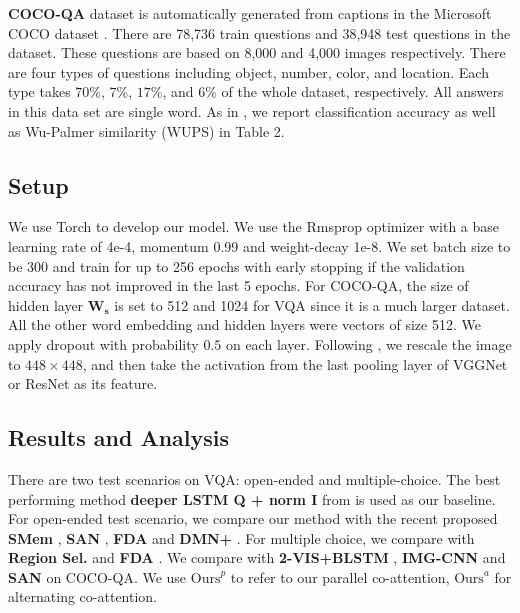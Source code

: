 \documentclass{article}
\begin{document}
\textbf{COCO-QA} dataset \cite{ren2015exploring} is automatically generated from captions in the Microsoft COCO dataset \cite{lin2014microsoft}. There are 78,736 train questions and 38,948 test questions in the dataset. These questions are based on 8,000 and 4,000 images respectively.  There are four types of questions including object, number, color, and location. Each type takes $70\%$, $7\%$, $17\%$, and $6\%$ of the whole dataset, respectively. All answers in this data set are single word. As in \cite{ren2015exploring}, we report classification accuracy as well as Wu-Palmer similarity (WUPS) in Table 2.
\subsection{Setup}
We use Torch \cite{torch} to develop our model. We use the Rmsprop optimizer with a base learning rate of 4e-4, momentum 0.99 and weight-decay 1e-8. We set batch size to be 300 and train for up to 256 epochs with early stopping if the validation accuracy has not improved in the last 5 epochs. For COCO-QA, the size of hidden layer $\bm{W_s}$ is set to 512 and 1024 for VQA since it is a much larger dataset. All the other word embedding and hidden layers were vectors of size 512. We apply dropout with probability $0.5$ on each layer. Following \cite{yang2015stacked}, we rescale the image to $448 \times 448$, and then take the activation from the last pooling layer of VGGNet \cite{Simonyan14c} or ResNet \cite{he2015deep} as its feature.
\subsection{Results and Analysis}
There are two test scenarios on VQA: open-ended and multiple-choice. The best performing method \textbf{deeper LSTM Q + norm I} from \cite{antol2015vqa} is used as our baseline. For open-ended test scenario, we compare our method with the recent proposed \textbf{SMem} \cite{xu2015ask}, \textbf{SAN} \cite{yang2015stacked}, \textbf{FDA} \cite{Ilievski2016} and \textbf{DMN+} \cite{xiong2016dynamic}. For multiple choice, we compare with \textbf{Region Sel.} \cite{shih2015look} and \textbf{FDA} \cite{Ilievski2016}. We compare with \textbf{2-VIS+BLSTM} \cite{ren2015exploring}, \textbf{IMG-CNN} \cite{ma2015learning} and \textbf{SAN} \cite{yang2015stacked} on COCO-QA. We use $\textrm{Ours}^p$ to refer to our parallel co-attention, $\textrm{Ours}^a$ for alternating co-attention.
\end{document}
